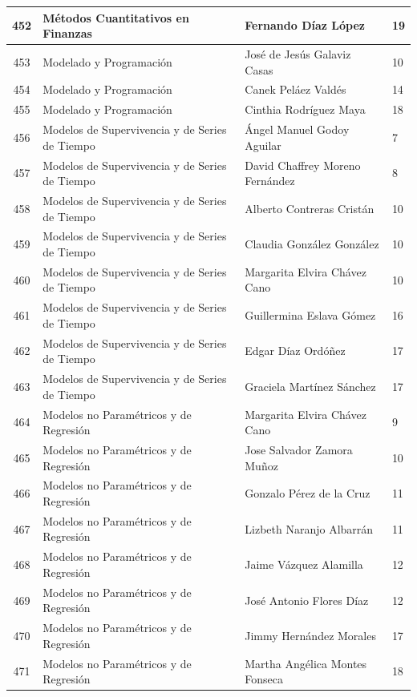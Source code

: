 {\begin{longtable}{|c|p{6.5cm}|p{5cm}|p{1.5cm}|}
  452 & Métodos Cuantitativos en Finanzas & Fernando Díaz López & 19 \\ \hline 
  453 & Modelado y Programación & José de Jesús Galaviz Casas & 10 \\ \hline 
  454 & Modelado y Programación & Canek Peláez Valdés & 14 \\ \hline 
  455 & Modelado y Programación & Cinthia Rodríguez Maya & 18 \\ \hline 
  456 & Modelos de Supervivencia y de Series de Tiempo & Ángel Manuel Godoy Aguilar & 7 \\ \hline 
  457 & Modelos de Supervivencia y de Series de Tiempo & David Chaffrey Moreno Fernández & 8 \\ \hline 
  458 & Modelos de Supervivencia y de Series de Tiempo & Alberto Contreras Cristán & 10 \\ \hline 
  459 & Modelos de Supervivencia y de Series de Tiempo & Claudia González González & 10 \\ \hline 
  460 & Modelos de Supervivencia y de Series de Tiempo & Margarita Elvira Chávez Cano & 10 \\ \hline 
  461 & Modelos de Supervivencia y de Series de Tiempo & Guillermina Eslava Gómez & 16 \\ \hline 
  462 & Modelos de Supervivencia y de Series de Tiempo & Edgar Díaz Ordóñez & 17 \\ \hline 
  463 & Modelos de Supervivencia y de Series de Tiempo & Graciela Martínez Sánchez & 17 \\ \hline 
  464 & Modelos no Paramétricos y de Regresión & Margarita Elvira Chávez Cano & 9 \\ \hline 
  465 & Modelos no Paramétricos y de Regresión & Jose Salvador Zamora Muñoz & 10 \\ \hline 
  466 & Modelos no Paramétricos y de Regresión & Gonzalo Pérez de la Cruz & 11 \\ \hline 
  467 & Modelos no Paramétricos y de Regresión & Lizbeth Naranjo Albarrán & 11 \\ \hline 
  468 & Modelos no Paramétricos y de Regresión & Jaime Vázquez Alamilla & 12 \\ \hline 
  469 & Modelos no Paramétricos y de Regresión & José Antonio Flores Díaz & 12 \\ \hline 
  470 & Modelos no Paramétricos y de Regresión & Jimmy Hernández Morales & 17 \\ \hline 
  471 & Modelos no Paramétricos y de Regresión & Martha Angélica Montes Fonseca & 18 \\ \hline 

\end{longtable}}
